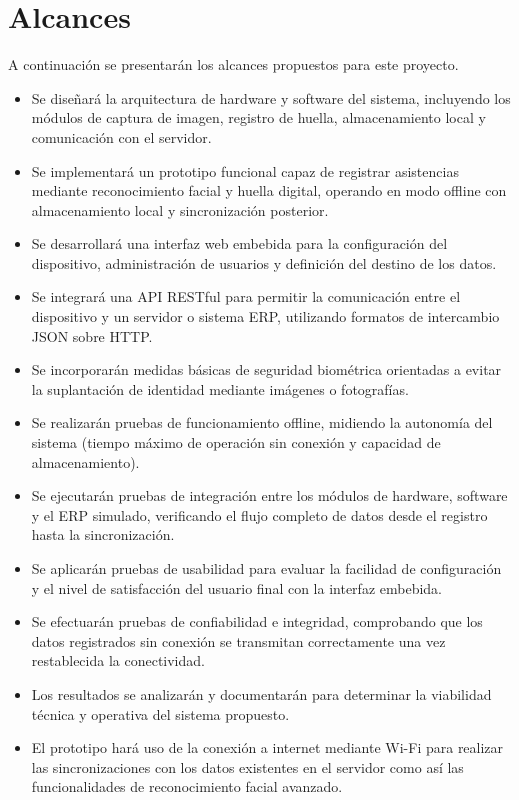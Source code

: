 \documentclass{iccmemoria}
\begin{document}
\section{Alcances}
A continuación se presentarán los alcances propuestos para este proyecto.

\begin{itemize}
    \item Se diseñará la arquitectura de hardware y software del sistema, incluyendo los módulos de captura de imagen, registro de huella, almacenamiento local y comunicación con el servidor.
    \item Se implementará un prototipo funcional capaz de registrar asistencias mediante reconocimiento facial y huella digital, operando en modo offline con almacenamiento local y sincronización posterior.
    \item Se desarrollará una interfaz web embebida para la configuración del dispositivo, administración de usuarios y definición del destino de los datos.
    \item Se integrará una API RESTful para permitir la comunicación entre el dispositivo y un servidor o sistema ERP, utilizando formatos de intercambio JSON sobre HTTP.
    \item Se incorporarán medidas básicas de seguridad biométrica orientadas a evitar la suplantación de identidad mediante imágenes o fotografías.
    \item Se realizarán pruebas de funcionamiento offline, midiendo la autonomía del sistema (tiempo máximo de operación sin conexión y capacidad de almacenamiento).
    \item Se ejecutarán pruebas de integración entre los módulos de hardware, software y el ERP simulado, verificando el flujo completo de datos desde el registro hasta la sincronización.
    \item Se aplicarán pruebas de usabilidad para evaluar la facilidad de configuración y el nivel de satisfacción del usuario final con la interfaz embebida.
    \item Se efectuarán pruebas de confiabilidad e integridad, comprobando que los datos registrados sin conexión se transmitan correctamente una vez restablecida la conectividad. 
    \item Los resultados se analizarán y documentarán para determinar la viabilidad técnica y operativa del sistema propuesto.
    \item El prototipo hará uso de la conexión a internet mediante Wi-Fi para realizar las sincronizaciones con los datos existentes en el servidor como así las funcionalidades de reconocimiento facial avanzado.
\end{itemize}
\end{document}
